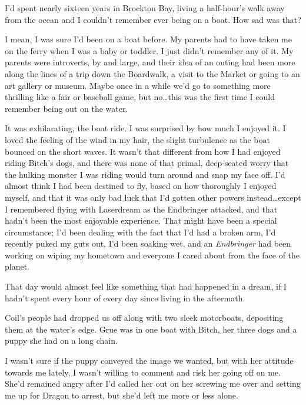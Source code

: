 





I'd spent nearly sixteen years in Brockton Bay, living a half-hour's walk away from the ocean and I couldn't remember ever being on a boat.  How sad was that?



I mean, I was sure I'd been on a boat before.  My parents had to have taken me on the ferry when I was a baby or toddler.  I just didn't remember any of it.  My parents were introverts, by and large, and their idea of an outing had been more along the lines of a trip down the Boardwalk, a visit to the Market or going to an art gallery or museum.  Maybe once in a while we'd go to something more thrilling like a fair or baseball game, but no\ldots this was the first time I could remember being out on the water.



It was exhilarating, the boat ride.  I was surprised by how much I enjoyed it.  I loved the feeling of the wind in my hair, the slight turbulence as the boat bounced on the short waves.  It wasn't that different from how I had enjoyed riding Bitch's dogs, and there was none of that primal, deep-seated worry that the hulking monster I was riding would turn around and snap my face off.  I'd almost think I had been destined to fly, based on how thoroughly I enjoyed myself, and that it was only bad luck that I'd gotten other powers instead\ldots except I remembered flying with Laserdream as the Endbringer attacked, and  that hadn't been the most enjoyable experience.  That might have been a special circumstance; I'd been dealing with the fact that I'd had a broken arm, I'd recently puked my guts out, I'd been soaking wet, and an \emph{Endbringer} had been working on wiping my hometown and everyone I cared about from the face of the planet.



That day would almost feel like something that had happened in a dream, if I hadn't spent every hour of every day since living in the aftermath.



Coil's people had dropped us off along with two sleek motorboats, depositing them at the water's edge.  Grue was in one boat with Bitch, her three dogs and a puppy she had on a long chain.



I wasn't sure if the puppy conveyed the image we wanted, but with her attitude towards me lately, I wasn't willing to comment and risk her going off on me.  She'd remained angry after I'd called her out on her screwing me over and setting me up for Dragon to arrest, but she'd left me more or less alone.



